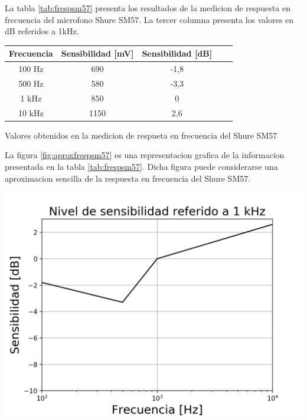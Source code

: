 \documentclass[]{article}
\makeatletter
\newenvironment{tablehere}    %
  {\def\@captype{table}}    %

  {}              %
\newenvironment{figurehere}   %
  {\def\@captype{figure}}   %
  {\par\medskip}
  {}              %
\makeatother
\begin{document}
\begin{multicols}{2}
La tabla \ref{tab:frespsm57} presenta los resultados de la medicion de respuesta en
frecuencia del microfono Shure SM57. La tercer columna presenta los valores en dB
referidos a 1kHz.

\begin{tablehere}
\begin{center}
\begin{tabular}{|c|c|c|c|c|}
\hline
Frecuencia & Sensibilidad [mV] & Sensibilidad [dB] \\
\hline
100 Hz & 690    & -1,8 \\
500 Hz & 580    & -3,3 \\
1  kHz & 850    & 0    \\
10 kHz & 1150   & 2,6  \\
\hline
\end{tabular}
\caption{Valores obtenidos en la medicion de respueta en frecuencia del
Shure SM57}
\label{tab:frespsm57}
\end{center}
\end{tablehere}

La figura \ref{fig:aproxfrespsm57} es una representacion grafica de la informacion
presentada en la tabla \ref{tab:frespsm57}. Dicha figura puede considerarse una
aproximacion sencilla de la respuesta en frecuencia del Shure SM57.

\begin{figurehere}
 \centering
 \includegraphics[width=\linewidth]{frespsm57}
 \label{fig:aproxfrespsm57}
\end{figurehere}



\end{multicols}
\end{document}
